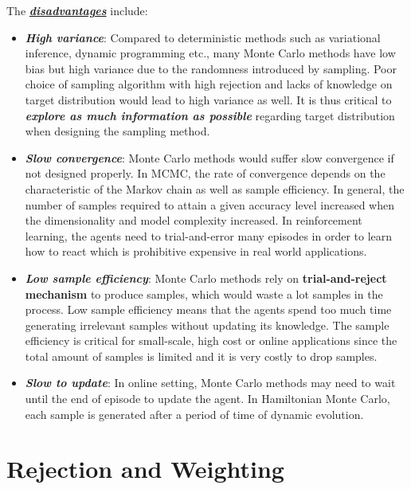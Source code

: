 \documentclass[11pt]{article}
\begin{document}
The \underline{\textit{\textbf{disadvantages}}} include:
\begin{itemize}
\item \textbf{\emph{High variance}}: Compared to deterministic methods such as variational inference, dynamic programming etc., many Monte Carlo methods have low bias but high variance due to the randomness introduced by sampling. Poor choice of sampling algorithm with high rejection and lacks of knowledge on target distribution would lead to high variance as well. It is thus critical to \textbf{\emph{explore as much information as possible}} regarding target distribution when designing the sampling method.  %

\item \textbf{\emph{Slow convergence}}: Monte Carlo methods would suffer slow convergence if not designed properly. In MCMC, the rate of convergence depends on the characteristic of the Markov chain as well as sample efficiency. In general, the number of samples required to attain a given accuracy level increased when the dimensionality and model complexity increased. In reinforcement learning, the agents need to trial-and-error many episodes in order to learn how to react which is prohibitive expensive in real world applications.

\item \textbf{\emph{Low sample efficiency}}: Monte Carlo methods rely on \textbf{trial-and-reject mechanism} to produce samples, which would waste a lot samples in the process. Low sample efficiency means that the agents spend too much time generating irrelevant samples without updating its knowledge. The sample efficiency is critical for small-scale, high cost or online applications since the total amount of samples is limited and it is very costly to drop samples.

\item \textbf{\emph{Slow to update}}: In online setting, Monte Carlo methods may need to wait until the end of episode to update the agent. In Hamiltonian Monte Carlo, each sample is generated after a period of time of dynamic evolution. 
\end{itemize}

\newpage
\section{Rejection and Weighting}
\end{document}
